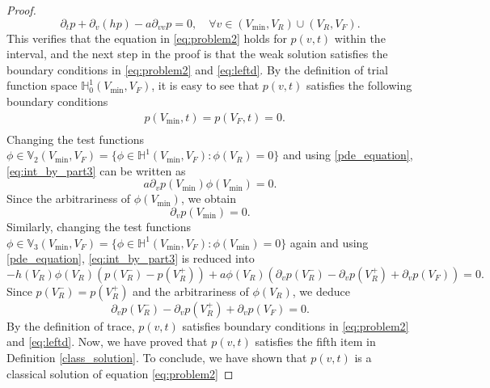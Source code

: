 \begin{proof}
\begin{equation}
    \label{pde_equation}
    \partial_{t}p+\partial_{v}(hp)-a\partial_{v v}p=0, \quad \forall v\in (V_{\min},V_R)\cup(V_R,V_F).
\end{equation}
This verifies that the equation in \eqref{eq:problem2} holds for  $p(v,t)$ within the interval, and the next step in the proof is that the weak solution satisfies the boundary conditions in \eqref{eq:problem2} and \eqref{eq:leftd}. By the definition of trial function space $\mathbb{H}^{1}_0(V_{\min},V_F)$, it is easy to see that $p(v,t)$ satisfies the following boundary conditions
\begin{equation}\label{eq:Dirichlet_boundary}
\begin{aligned}
    &p(V_{\min},t)=p(V_F,t)=0.\\
\end{aligned}
\end{equation}
Changing the test functions $\phi \in \mathbb{V}_2(V_{\min},V_F)=\{\phi \in \mathbb{H}^1(V_{\min},V_F): \phi(V_R)=0\}$ and using \eqref{pde_equation}, \eqref{eq:int_by_part3} can be written as
\begin{equation}
    a\partial_vp(V_{\min})\phi(V_{\min})=0.
\end{equation}
Since the arbitrariness of $\phi(V_{\min})$, we obtain
\begin{equation}\label{eq:left_boundary}
    \partial_vp(V_{\min})=0.
\end{equation}
Similarly, changing the test functions $\phi \in \mathbb{V}_3(V_{\min},V_F)=\{\phi \in \mathbb{H}^1(V_{\min},V_F): \phi(V_{\min})=0\}$ again and using \eqref{pde_equation}, \eqref{eq:int_by_part3} is reduced into
\begin{equation}
    -h(V_R)\phi(V_R)\left(p(V_R^-)-p(V_R^+)\right)+a\phi(V_R)\left(\partial_vp(V_R^-)-\partial_vp(V_R^+)+\partial_vp(V_F)\right)=0.
\end{equation}
Since $p(V^-_R)=p(V^+_R) $ and the arbitrariness of $\phi(V_R)$, we deduce
\begin{equation}
    \partial_vp(V_R^-)-\partial_vp(V_R^+)+\partial_vp(V_F)=0.
\end{equation}
By the definition of trace, $p(v,t)$ satisfies boundary conditions in \eqref{eq:problem2} and \eqref{eq:leftd}. Now, we have proved that $p(v,t)$ satisfies the fifth item in Definition \ref{class_solution}.  To conclude, we have shown that $p(v,t)$ is a classical solution of equation \eqref{eq:problem2}


\end{proof}